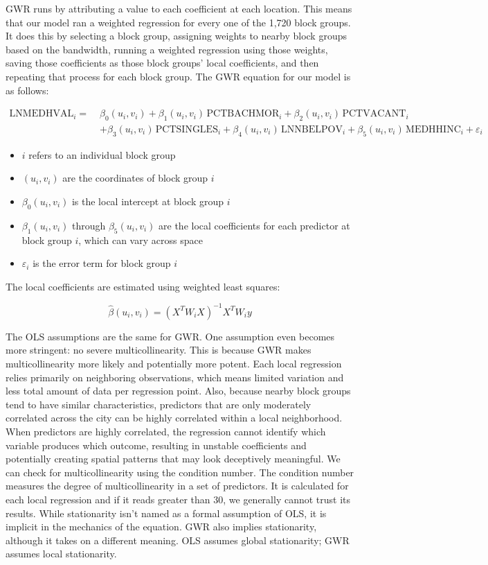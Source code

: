 \documentclass[
  12pt,
]{article}
\providecommand{\tightlist}{%
  \setlength{\itemsep}{0pt}\setlength{\parskip}{0pt}}
\begin{document}
GWR runs by attributing a value to each coefficient at each location.
This means that our model ran a weighted regression for every one of the
1,720 block groups. It does this by selecting a block group, assigning
weights to nearby block groups based on the bandwidth, running a
weighted regression using those weights, saving those coefficients as
those block groups' local coefficients, and then repeating that process
for each block group. The GWR equation for our model is as follows:

\[\begin{aligned}
\text{LNMEDHVAL}_i = \; & \beta_0(u_i, v_i) + \beta_1(u_i, v_i)\,\text{PCTBACHMOR}_i + \beta_2(u_i, v_i)\,\text{PCTVACANT}_i \\
& + \beta_3(u_i, v_i)\,\text{PCTSINGLES}_i + \beta_4(u_i, v_i)\,\text{LNNBELPOV}_i + \beta_5(u_i, v_i)\,\text{MEDHHINC}_i + \varepsilon_i
\end{aligned}\]

\begin{itemize}
\tightlist
\item
  \(i\) refers to an individual block group
\item
  \((u_i,v_i)\) are the coordinates of block group \(i\)
\item
  \(\beta_0(u_i,v_i)\) is the local intercept at block group \(i\)
\item
  \(\beta_1(u_i,v_i)\) through \(\beta_5(u_i,v_i)\) are the local
  coefficients for each predictor at block group \(i\), which can vary
  across space
\item
  \(\varepsilon_i\) is the error term for block group \(i\)
\end{itemize}

The local coefficients are estimated using weighted least squares:

\[ \hat{\beta}(u_i, v_i) = (X^T W_i X)^{-1} X^T W_i y \]

The OLS assumptions are the same for GWR. One assumption even becomes
more stringent: no severe multicollinearity. This is because GWR makes
multicollinearity more likely and potentially more potent. Each local
regression relies primarily on neighboring observations, which means
limited variation and less total amount of data per regression point.
Also, because nearby block groups tend to have similar characteristics,
predictors that are only moderately correlated across the city can be
highly correlated within a local neighborhood. When predictors are
highly correlated, the regression cannot identify which variable
produces which outcome, resulting in unstable coefficients and
potentially creating spatial patterns that may look deceptively
meaningful. We can check for multicollinearity using the condition
number. The condition number measures the degree of multicollinearity in
a set of predictors. It is calculated for each local regression and if
it reads greater than 30, we generally cannot trust its results. While
stationarity isn't named as a formal assumption of OLS, it is implicit
in the mechanics of the equation. GWR also implies stationarity,
although it takes on a different meaning. OLS assumes global
stationarity; GWR assumes local stationarity.
\end{document}

